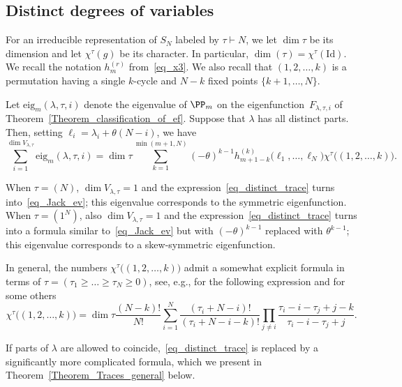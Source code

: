 \subsection{Distinct degrees of variables}

For an irreducible representation of $S_N$ labeled by $\tau\vdash N$, we let $\dim \tau$ be its dimension  and let $\chi^{\tau}(g)$ be its character. In particular, $\dim(\tau)=\chi^{\tau}(\mathrm{Id})$. We recall the notation $h_m^{(r)}$ from~\eqref{eq_x3}. We also recall that $(1,2,\dots,k)$ is a permutation having a single $k$-cycle and $N-k$ fixed points $\{k+1,\dots,N\}$.

\begin{theorem} \label{Theorem_Traces_distinct}
 Let $\mathrm{eig}_m(\lambda,\tau,i)$ denote the eigenvalue of $\PP_m$ on the eigenfunction~$F_{\lambda,\tau,i}$  of Theorem~\ref{Theorem_classification_of_ef}. Suppose that $\lambda$ has all distinct parts. Then, setting $\ell_i=\lambda_i+\theta(N-i)$, we have
 \begin{equation}
 \label{eq_distinct_trace}
  \sum_{i=1}^{\dim V_{\lambda,\tau}} \mathrm{eig}_m(\lambda,\tau,i) = \dim \tau \sum_{k=1}^{\min(m+1,N)}  (-\theta)^{k-1}  h^{(k)}_{m+1-k}\bigl(\ell_1,\dots,\ell_N\bigr) \chi^\tau\bigl( (1,2,\dots,k) ).
 \end{equation}
\end{theorem}
When $\tau=(N)$, $\dim V_{\lambda,\tau}=1$ and the expression~\eqref{eq_distinct_trace} turns into~\eqref{eq_Jack_ev}; this eigenvalue corresponds to the symmetric eigenfunction. When $\tau=(1^N)$, also $\dim V_{\lambda,\tau}=1$ and the expression~\eqref{eq_distinct_trace} turns into a formula similar to~\eqref{eq_Jack_ev} but with $(-\theta)^{k-1}$ replaced with $\theta^{k-1}$; this eigenvalue corresponds to a skew-symmetric eigenfunction.

In general, the numbers $\chi^\tau\bigl( (1,2,\dots, k) )$ admit a somewhat explicit formula in terms of $\tau=(\tau_1\ge \dots\ge\tau_N\ge 0)$, see, e.g., \cite[Example I.7.7]{macdonald1998symmetric} for the following expression and \cite[Section 3]{ivanov2002kerov} for some others
\begin{equation}
\label{eq_one_cycle_characters}
 \chi^\tau\bigl( (1,2,\dots, k) )=\dim \tau \frac{(N-k)!}{N!} \sum_{i=1}^N \frac{(\tau_i+N-i)!}{(\tau_i+N-i-k)!} \prod_{j\ne i} \frac{\tau_i-i-\tau_j+j-k}{\tau_i-i-\tau_j+j}.
\end{equation}

If parts of $\lambda$ are allowed to coincide,~\eqref{eq_distinct_trace} is replaced by a significantly more complicated formula, which we present in Theorem~\ref{Theorem_Traces_general} below.

